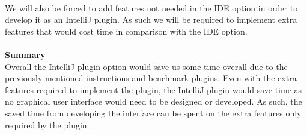 \documentclass{l3proj}
\begin{document}
\\
We will also be forced to add features not needed in the IDE option in order to develop it as an IntelliJ plugin. As such we will be required to implement extra features that would cost time in comparison with the IDE option. \\
\\
 \textbf {\underline{Summary}}\\
 Overall the IntelliJ plugin option would save us some time overall due to the previously mentioned instructions and benchmark plugins. Even with the extra features required to implement the plugin, the IntelliJ plugin would save time as no graphical user interface would need to be designed or developed. As such, the saved time from developing the interface can be spent on the extra features only required by the plugin.
 
\end{document}
